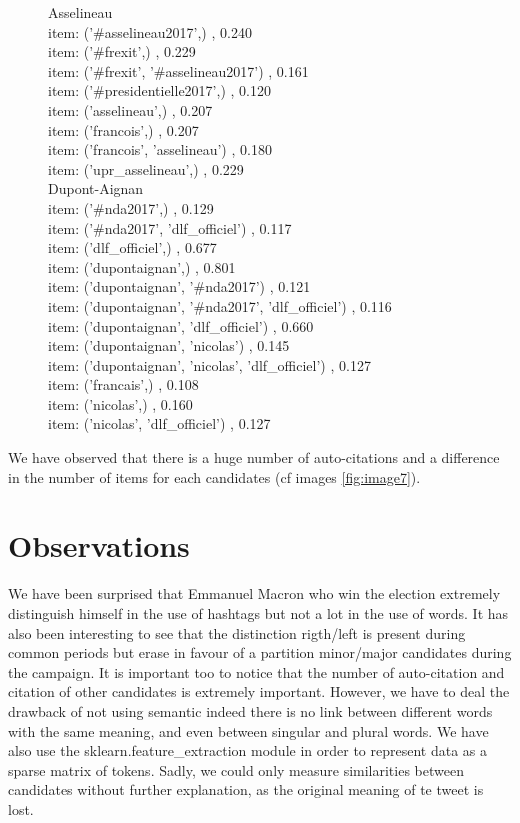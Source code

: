 \documentclass[a4paper]{article}
\theoremstyle{definition}
\begin{document}
\begin{figure}
{Asselineau\\
item: ('\#asselineau2017',) , 0.240\\
item: ('\#frexit',) , 0.229\\
item: ('\#frexit', '\#asselineau2017') , 0.161\\
item: ('\#presidentielle2017',) , 0.120\\
item: ('asselineau',) , 0.207\\
item: ('francois',) , 0.207\\
item: ('francois', 'asselineau') , 0.180\\
item: ('upr\_asselineau',) , 0.229\\
Dupont-Aignan\\
item: ('\#nda2017',) , 0.129\\
item: ('\#nda2017', 'dlf\_officiel') , 0.117\\
item: ('dlf\_officiel',) , 0.677\\
item: ('dupontaignan',) , 0.801\\
item: ('dupontaignan', '\#nda2017') , 0.121\\
item: ('dupontaignan', '\#nda2017', 'dlf\_officiel') , 0.116\\
item: ('dupontaignan', 'dlf\_officiel') , 0.660\\
item: ('dupontaignan', 'nicolas') , 0.145\\
item: ('dupontaignan', 'nicolas', 'dlf\_officiel') , 0.127\\
item: ('francais',) , 0.108\\
item: ('nicolas',) , 0.160\\
item: ('nicolas', 'dlf\_officiel') , 0.127\\
}
\endgroup
{}
\end{figure}

We have observed that there is a huge number of auto-citations and a difference in the number of items for each candidates (cf images \ref{fig:image7}).


\section{Observations}
We have been surprised that Emmanuel Macron who win the election extremely distinguish himself in the use of hashtags but not a lot in the use of words.
It has also been interesting to see that the distinction rigth/left is present during common periods but erase in favour of a partition minor/major candidates during the campaign.
It is important too to notice that the number of auto-citation and citation of other candidates is extremely important.
However, we have to deal the drawback of not using semantic indeed there is no link between different words with the same meaning, and even between singular and plural words.
We have also use the sklearn.feature\_extraction module in order to represent data as a sparse matrix of tokens. Sadly, we could only measure similarities between candidates without further explanation, as the original meaning of te tweet is lost.
\end{document}
